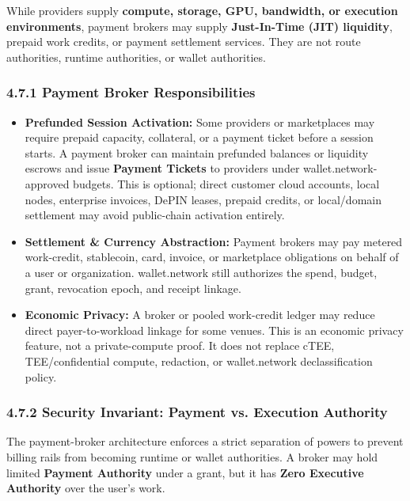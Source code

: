 \documentclass[
  11pt,
]{article}
\begin{document}
While providers supply \textbf{compute, storage, GPU, bandwidth, or
execution environments}, payment brokers may supply \textbf{Just-In-Time
(JIT) liquidity}, prepaid work credits, or payment settlement services.
They are not route authorities, runtime authorities, or wallet
authorities.

\hypertarget{payment-broker-responsibilities}{%
\subsubsection{4.7.1 Payment Broker
Responsibilities}\label{payment-broker-responsibilities}}

\begin{itemize}
\item
  \textbf{Prefunded Session Activation:} Some providers or marketplaces
  may require prepaid capacity, collateral, or a payment ticket before a
  session starts. A payment broker can maintain prefunded balances or
  liquidity escrows and issue \textbf{Payment Tickets} to providers under
  wallet.network-approved budgets. This is optional; direct customer
  cloud accounts, local nodes, enterprise invoices, DePIN leases, prepaid
  credits, or local/domain settlement may avoid public-chain activation
  entirely.
\item
  \textbf{Settlement \& Currency Abstraction:} Payment brokers may pay
  metered work-credit, stablecoin, card, invoice, or marketplace
  obligations on behalf of a user or organization. wallet.network still
  authorizes the spend, budget, grant, revocation epoch, and receipt
  linkage.
\item
  \textbf{Economic Privacy:} A broker or pooled work-credit ledger may
  reduce direct payer-to-workload linkage for some venues. This is an
  economic privacy feature, not a private-compute proof. It does not
  replace cTEE, TEE/confidential compute, redaction, or wallet.network
  declassification policy.
\end{itemize}

\hypertarget{security-invariant-payment-vs-execution-authority}{%
\subsubsection{4.7.2 Security Invariant: Payment vs. Execution
Authority}\label{security-invariant-payment-vs-execution-authority}}

The payment-broker architecture enforces a strict separation of powers to
prevent billing rails from becoming runtime or wallet authorities. A
broker may hold limited \textbf{Payment Authority} under a grant, but it
has \textbf{Zero Executive Authority} over the user's work.
\end{document}
